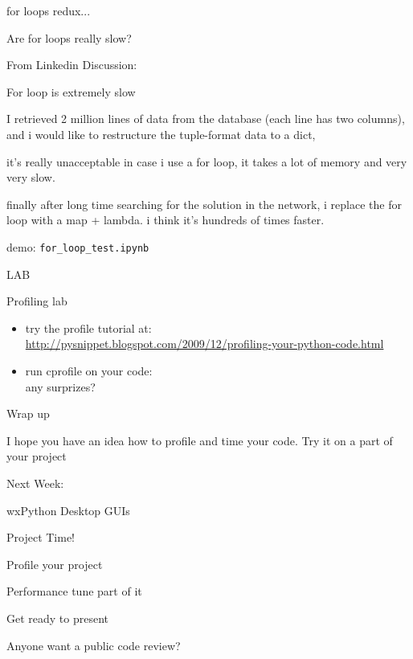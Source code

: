 \documentclass{beamer}
\begin{document}
\begin{frame}[fragile]{for loops redux...}

{\LARGE Are for loops really slow?}

\vfill
{\Large From Linkedin Discussion:}

\vfill
{\large For loop is extremely slow}

I retrieved 2 million lines of data from the database (each line has two columns), and i would like to restructure the tuple-format data to a dict,

it's really unacceptable in case i use a for loop, it takes a lot of memory and very very slow.

finally after long time searching for the solution in the network, i replace the for loop with a map + lambda. i think it's hundreds of times faster.


\vfill
demo: \verb|for_loop_test.ipynb|

\end{frame} 

\begin{frame}[fragile]{LAB}

{\Large Profiling lab}
\begin{itemize}
  \item try the profile tutorial at:\\
        {\small \url{http://pysnippet.blogspot.com/2009/12/profiling-your-python-code.html} }

  \item run cprofile on your code:\\
        any surprizes? 
\end{itemize}

\end{frame}


\begin{frame}[fragile]{Wrap up}

\vfill
{\Large I hope you have an idea how to profile and time your code.}
\vfill
{\Large Try it on a part of your project}
\vfill

\end{frame}

\begin{frame}{Next Week:}

\vfill
{\LARGE wxPython Desktop GUIs}

\vfill

\end{frame}

\begin{frame}[fragile]{Project Time!}

\vfill
\Large{Profile your project}

\vfill
\Large{Performance tune part of it}

\vfill
\Large{Get ready to present}

\vfill
\Large{Anyone want a public code review?}

\end{frame}
\end{document}
